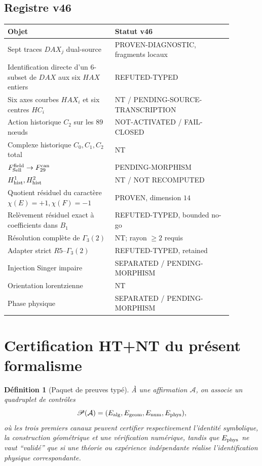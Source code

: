 \documentclass[11pt,a4paper]{article}
\newtheorem{definition}[theorem]{Définition}
\begin{document}
\subsection{Registre v46}
\begin{center}
\begin{tabular}{p{0.42\linewidth}p{0.46\linewidth}}
\toprule
Objet & Statut v46\\
\midrule
Sept traces $DAX_j$ dual-source & PROVEN-DIAGNOSTIC, fragments locaux\\
Identification directe d'un $6$-subset de $DAX$ aux six $HAX$ entiers & REFUTED-TYPED\\
Six axes courbes $HAX_i$ et six centres $HC_i$ & NT / PENDING-SOURCE-TRANSCRIPTION\\
Action historique $C_2$ sur les $89$ nœuds & NOT-ACTIVATED / FAIL-CLOSED\\
Complexe historique $C_0,C_1,C_2$ total & NT\\
$F_{\rm Sell}^{\rm field}\to F_{29}^{\rm can}$ & PENDING-MORPHISM\\
$H^1_{\rm hist},H^2_{\rm hist}$ & NT / NOT RECOMPUTED\\
Quotient résiduel du caractère $\chi(E)=+1,\chi(F)=-1$ & PROVEN, dimension $14$\\
Relèvement résiduel exact à coefficients dans $B_1$ & REFUTED-TYPED, bounded no-go\\
Résolution complète de $\Gamma_3(2)$ & NT; rayon $\ge2$ requis\\
Adapter strict $R5$--$\Gamma_3(2)$ & REFUTED-TYPED, retained\\
Injection Singer impaire & SEPARATED / PENDING-MORPHISM\\
Orientation lorentzienne & NT\\
Phase physique & SEPARATED / PENDING-MORPHISM\\
\bottomrule
\end{tabular}
\end{center}

\section{Certification HT+NT du présent formalisme}

\begin{definition}[Paquet de preuves typé]
À une affirmation $\mathcal A$, on associe un quadruplet de contrôles
\[
 \mathscr P(\mathcal A)=(E_{\rm alg},E_{\rm geom},E_{\rm num},E_{\rm phys}),
\]
où les trois premiers canaux peuvent certifier respectivement l'identité symbolique, la construction géométrique et une vérification numérique, tandis que $E_{\rm phys}$ ne vaut ``validé'' que si une théorie ou expérience indépendante réalise l'identification physique correspondante.
\end{definition}
\end{document}
